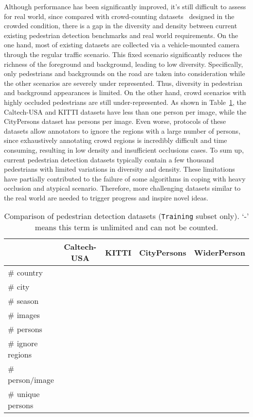 \documentclass[journal]{IEEEtran}
\begin{document}
Although performance has been significantly improved, it's still difficult to assess for real world, since compared with crowd-counting datasets~\cite{DBLP:conf/cvpr/IdreesSSS13,DBLP:conf/cvpr/ShaoKLW15} designed in the crowded condition, there is a gap in the diversity and density between current existing pedestrian detection benchmarks and real world requirements. On the one hand, most of existing datasets are collected via a vehicle-mounted camera through the regular traffic scenario. This fixed scenario significantly reduces the richness of the foreground and background, leading to low diversity. Specifically, only pedestrians and backgrounds on the road are taken into consideration while the other scenarios are severely under represented. Thus, diversity in pedestrian and background appearances is limited. On the other hand, crowd scenarios with highly occluded pedestrians are still under-represented. As shown in Table~\ref{tab:dataset_statistics}, the Caltech-USA and KITTI datasets have less than one person per image, while the CityPersons dataset has  persons per image. Even worse, protocols of these datasets allow annotators to ignore the regions with a large number of persons, since exhaustively annotating crowd regions is incredibly difficult and time consuming, resulting in low density and insufficient occlusions cases. To sum up, current pedestrian detection datasets typically contain a few thousand pedestrians with limited variations in diversity and density. These limitations have partially contributed to the failure of some algorithms in coping with heavy occlusion and atypical scenario. Therefore, more challenging datasets similar to the real world are needed to trigger progress and inspire novel ideas.

\begin{table}[t]
\caption{Comparison of pedestrian detection datasets ({\tt Training} subset only). `-' means this term is unlimited and can not be counted.}
\centering
\begin{tabular}{l|cccc}
\toprule[2pt]
 & \scriptsize{Caltech-USA} & \scriptsize{KITTI} & \scriptsize{CityPersons} & \scriptsize{WiderPerson} \\
\midrule[1pt]
\# country &  &  &  &  \\
\# city &  &  &  &  \\
\# season &  &  &  &  \\
\# images &  &  &  &  \\
\# persons &  &  &  &  \\
\# ignore regions &  &  &  &  \\
\# person/image &  &  &  &  \\
\# unique persons &  &  &  &  \\
\bottomrule[2pt]
\end{tabular}
\label{tab:dataset_statistics}
\end{table}
\end{document}
